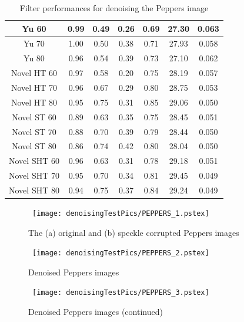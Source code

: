 \documentclass[12pt]{report}
\renewcommand{\baselinestretch}{1.5}
\begin{document}
\begin{table}[p]
\begin{center}
\begin{scriptsize}
\begin{tabular}{|c|c|c|c|c|c|c|}
Yu 60			& 0.99	& 0.49		& 0.26		& 0.69	& 27.30		& 0.063		\\ \hline
Yu 70			& 1.00	& 0.50		& 0.38		& 0.71	& 27.93		& 0.058		\\ \hline
Yu 80			& 0.96	& 0.54		& 0.39		& 0.73	& 27.10		& 0.062		\\ \hline \hline


Novel HT 60 		& 0.97	& 0.58		& 0.20		& 0.75	& 28.19		& 0.057		\\ \hline
Novel HT 70		& 0.96	& 0.67		& 0.29		& 0.80	& 28.75		& 0.053		\\ \hline
Novel HT 80		& 0.95	& 0.75		& 0.31		& 0.85	& 29.06		& 0.050		\\ \hline \hline

Novel ST 60		& 0.89	& 0.63		& 0.35		& 0.75	& 28.45		& 0.051		\\ \hline
Novel ST 70		& 0.88	& 0.70		& 0.39		& 0.79	& 28.44		& 0.050		\\ \hline
Novel ST 80		& 0.86	& 0.74		& 0.42		& 0.80	& 28.04		& 0.050		\\ \hline \hline

Novel SHT 60		& 0.96	& 0.63		& 0.31		& 0.78	& 29.18		& 0.051		\\ \hline
Novel SHT 70		& 0.95	& 0.70		& 0.34		& 0.81	& 29.45		& 0.049		\\ \hline
Novel SHT 80		& 0.94	& 0.75		& 0.37		& 0.84	& 29.24		& 0.049		\\ \hline

\end{tabular}
\end{scriptsize}
\end{center}
\caption{Filter performances for denoising the Peppers image}
\label{tab:PeppersDN}
\renewcommand{\baselinestretch}{1.5}
\setlength{\abovecaptionskip}{0cm}
\end{table}

\begin{figure}[p]
	\centerline{ \hbox{
                \texttt{[image: denoisingTestPics/PEPPERS\_1.pstex]}
	}}
        \caption{The (a) original and (b) speckle corrupted Peppers images}
	\label{fig:pep_a}
\end{figure}
\begin{figure}[p]
	\centerline{ \hbox{
                \texttt{[image: denoisingTestPics/PEPPERS\_2.pstex]}
	}}
        \caption{Denoised Peppers images} 
	\label{fig:pep_b}
\end{figure}
\begin{figure}[p]
	\centerline{ \hbox{
                \texttt{[image: denoisingTestPics/PEPPERS\_3.pstex]}
	}}
        \caption{Denoised Peppers images (continued)} 
	\label{fig:pep_c}
\end{figure}
\end{document}

